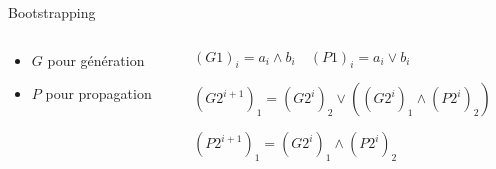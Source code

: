 \documentclass[10pt,xcolor={usenames,dvipsnames}]{beamer}
\begin{document}
\begin{section}{Bootstrapping}
\begin{frame}
\begin{columns}
\begin{column}{0.4\textwidth}
\begin{itemize}
\item $G$ pour génération
  \begin{figure}
    \begin{center}
      \begin{tikzpicture}[scale = 0.6, transform shape]
      	
      \end{tikzpicture}
    \end{center}
  \end{figure}
\item $P$ pour propagation
  \begin{figure}
    \begin{center}
      \begin{tikzpicture}[scale = 0.6, transform shape]
      	
      \end{tikzpicture}
    \end{center}
  \end{figure}
\end{itemize}
\end{column}

\begin{column}{0.6\textwidth}  %
\pause


$(G1)_i = a_i \wedge b_i \quad (P1)_i = a_i \vee b_i$
\pause

  \begin{figure}
    \begin{center}
      \begin{tikzpicture}[scale = 0.9, transform shape]
      	
      \end{tikzpicture}
    \end{center}
  \end{figure}

${(G2^{i+1})}_1 = {(G2^i)}_2 \vee \left ( {(G2^i)}_1 \wedge {(P2^i)}_2 \right)$\\

\vspace{0.3cm}

${(P2^{i+1})}_1 = {(G2^i)}_1 \wedge {(P2^i)}_2$

\end{column}
\end{columns}


\end{frame}
\end{section}
\end{document}
